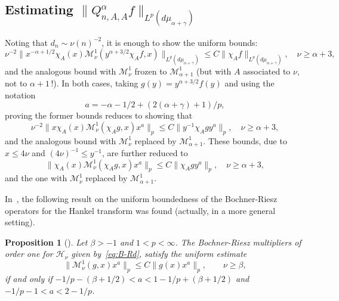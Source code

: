 \documentclass[a4paper]{amsart}
\newcommand{\calM}{\mathcal{M}}
\newcommand{\calH}{\mathcal{H}}
\newcommand{\muag}{d\mu_{\alpha+\gamma}}
\newtheorem{propo}{Proposition}
\begin{document}
\subsection{Estimating $\|Q^\alpha_{n,A,A}f\|_{L^p(\muag)}$}

Noting that $d_n\sim \nu(n)^{-2}$, it is enough to show the uniform bounds:
\begin{equation*}
  \nu^{-2} \|x^{-\alpha+1/2}\chi_A(x)
    \calM_{\nu}^1(y^{\alpha+3/2}\chi_Af,x)\|_{L^p(\muag)}
  \le C\|\chi_Af\|_{L^p(\muag)}, \quad \nu\ge\alpha+3,
\end{equation*}
and the analogous bound with $\calM_{\nu}^1$ frozen to
$\calM_{\alpha+1}^1$ (but with $A$ associated to $\nu$,
not to $\alpha+1$\,!). In both cases,
taking $g(y)=y^{\alpha+3/2}f(y)$ and using the notation
\begin{equation}
\label{eq:aaa}
  a = -\alpha-1/2+(2(\alpha+\gamma)+1)/p,
\end{equation}
proving the former bounds reduces to showing that
\begin{equation*}
  \nu^{-2}\|x\chi_A(x)\calM_\nu^1(\chi_Ag,x)x^a\|_p
  \le C\|y^{-1}\chi_Agy^a\|_p,
  \quad \nu\ge\alpha+3,
\end{equation*}
and the analogous bound with $\calM_{\nu}^1$ replaced by
$\calM_{\alpha+1}^1$.
These bounds, due to $x\le4\nu$ and $(4\nu)^{-1}\le y^{-1}$,
are further reduced to
\begin{equation}
\label{eq:red}
  \|\chi_A(x)\calM_\nu^1(\chi_Ag,x)x^a\|_p
  \le C \|\chi_Agy^a\|_p,
  \quad \nu\ge\alpha+3,
\end{equation}
and the one with $\calM_{\nu}^1$ replaced by
$\calM_{\alpha+1}^1$.

In~\cite{CiStV}, the following result on the uniform boundedness
of the Bochner-Riesz operators for the Hankel
transform was found (actually, in a more general setting).

\begin{propo}[{\cite[Theorem~1]{CiStV}}]
\label{pro:acotSnu}
Let $\beta>-1$ and $1<p<\infty$.
The Bochner-Riesz multipliers of order one for $\calH_\nu$
given by~\eqref{eq:B-Rd}, satisfy the uniform estimate
\begin{equation*}
  \| \calM_{\nu}^1(g,x) x^a \|_p \le C \| g(x) x^a \|_p,
  \qquad \nu\ge \beta,
\end{equation*}
if and only if $-1/p - (\beta+1/2) < a < 1 - 1/p + (\beta+1/2)$
and $-1/p - 1 < a < 2 - 1/p$.
\end{propo}
\end{document}
